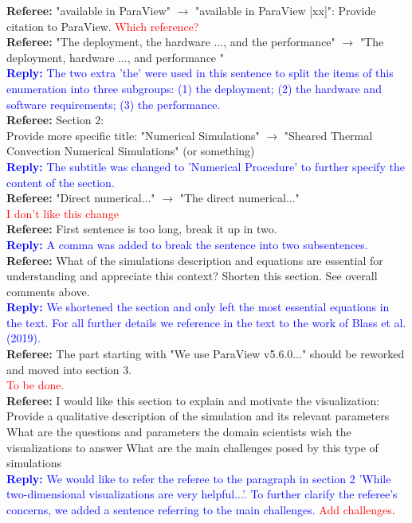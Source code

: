 \documentclass[]{article}
\begin{document}
\textbf{Referee:} "available in ParaView" $\rightarrow$ "available in ParaView [xx]": Provide citation to ParaView.
\textcolor{red}{Which reference?} \\

\textbf{Referee:} "The deployment, the hardware ..., and the performance" $\rightarrow$ "The deployment, hardware ..., and performance " \\
\textcolor{blue}{\textbf{Reply:} The two extra 'the' were used in this sentence to split the items of this enumeration into three subgroups: (1) the deployment; (2) the hardware and software requirements; (3) the performance.} \\

\textbf{Referee:} Section 2: \\
Provide more specific title: "Numerical Simulations" $\rightarrow$ "Sheared Thermal Convection Numerical Simulations" (or something) \\
\textcolor{blue}{\textbf{Reply:} The subtitle was changed to 'Numerical Procedure' to further specify the content of the section.} \\
	
\textbf{Referee:} "Direct numerical..." $\rightarrow$ "The direct numerical..."\\
\textcolor{red}{I don't like this change}\\

\textbf{Referee:} First sentence is too long, break it up in two.\\
\textcolor{blue}{\textbf{Reply:} A comma was added to break the sentence into two subsentences.}\\

\textbf{Referee:} What of the simulations description and equations are essential for understanding and appreciate this context? Shorten this section. See overall comments above.\\
\textcolor{blue}{\textbf{Reply:} We shortened the section and only left the most essential equations in the text. For all further details we reference in the text to the work of Blass et al. (2019).}\\

\textbf{Referee:} The part starting with "We use ParaView v5.6.0..." should be reworked and moved into section 3.\\
\textcolor{red}{To be done.}\\

\textbf{Referee:} I would like this section to explain and motivate the visualization:
Provide a qualitative description of the simulation and its relevant parameters
What are the questions and parameters the domain scientists wish the visualizations to answer
What are the main challenges posed by this type of simulations\\
\textcolor{blue}{\textbf{Reply:} We would like to refer the referee to the paragraph in section 2 'While two-dimensional visualizations are very helpful...'. To further clarify the referee's concerns, we added a sentence referring to the main challenges.} \textcolor{red}{Add challenges}.\\
\end{document}
